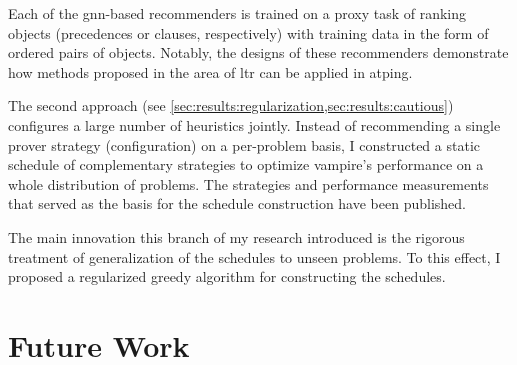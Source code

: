 Each of the \acrshort{gnn}-based recommenders is trained on a proxy task of ranking objects (precedences or clauses, respectively)
with training data in the form of ordered pairs of objects.
Notably, the designs of these recommenders demonstrate how methods proposed in the area of \acrlong{ltr}
can be applied in \gls{atping}.

The second approach (see \cref{sec:results:regularization,sec:results:cautious}) configures a large number of heuristics jointly.
Instead of recommending a single prover strategy (configuration) on a per-problem basis,
I constructed a static schedule of complementary strategies to optimize \gls{vampire}'s performance on a whole distribution of problems.
The strategies and performance measurements that served as the basis for the schedule construction have been published.

The main innovation this branch of my research introduced is the rigorous treatment of generalization of the schedules to unseen problems.
To this effect, I proposed a regularized greedy algorithm for constructing the schedules.


\section{Future Work}



